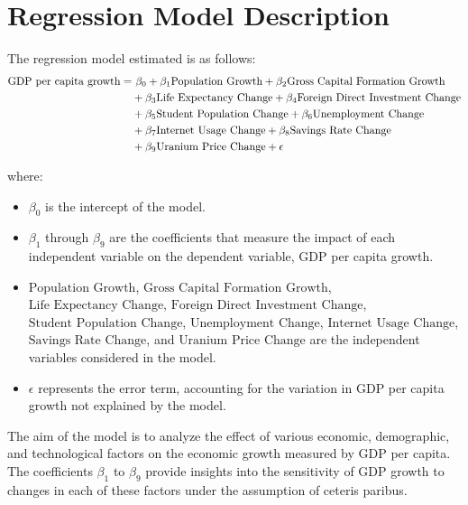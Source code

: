 \documentclass[12pt]{article}  %
\begin{document}
\section*{Regression Model Description}

The regression model estimated is as follows:
\begin{align}
\text{GDP per capita growth} = & \ \beta_0 + \beta_1 \text{Population Growth} + \beta_2 \text{Gross Capital Formation Growth} \notag \\
& + \beta_3 \text{Life Expectancy Change} + \beta_4 \text{Foreign Direct Investment Change} \notag \\
& + \beta_5 \text{Student Population Change} + \beta_6 \text{Unemployment Change} \notag \\
& + \beta_7 \text{Internet Usage Change} + \beta_8 \text{Savings Rate Change} \notag \\
& + \beta_9 \text{Uranium Price Change} + \epsilon \notag
\end{align}

where:
\begin{itemize}
    \item $\beta_0$ is the intercept of the model.
    \item $\beta_1$ through $\beta_9$ are the coefficients that measure the impact of each independent variable on the dependent variable, GDP per capita growth.
    \item $\text{Population Growth}$, $\text{Gross Capital Formation Growth}$, $\text{Life Expectancy Change}$, $\text{Foreign Direct Investment Change}$, $\text{Student Population Change}$, $\text{Unemployment Change}$, $\text{Internet Usage Change}$, $\text{Savings Rate Change}$, and $\text{Uranium Price Change}$ are the independent variables considered in the model.
    \item $\epsilon$ represents the error term, accounting for the variation in GDP per capita growth not explained by the model.
\end{itemize}

The aim of the model is to analyze the effect of various economic, demographic, and technological factors on the economic growth measured by GDP per capita. The coefficients $\beta_1$ to $\beta_9$ provide insights into the sensitivity of GDP growth to changes in each of these factors under the assumption of ceteris paribus.
\end{document}
